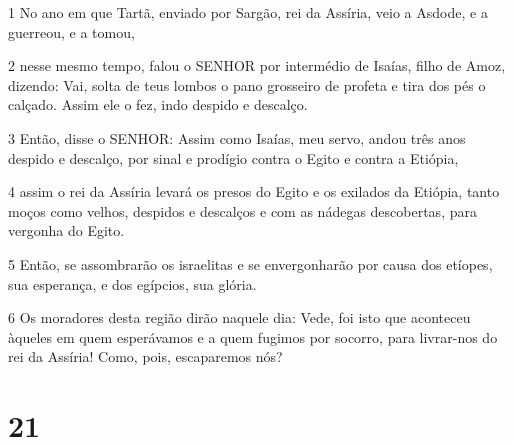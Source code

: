 \par 1 No ano em que Tartã, enviado por Sargão, rei da Assíria, veio a Asdode, e a guerreou, e a tomou,
\par 2 nesse mesmo tempo, falou o SENHOR por intermédio de Isaías, filho de Amoz, dizendo: Vai, solta de teus lombos o pano grosseiro de profeta e tira dos pés o calçado. Assim ele o fez, indo despido e descalço.
\par 3 Então, disse o SENHOR: Assim como Isaías, meu servo, andou três anos despido e descalço, por sinal e prodígio contra o Egito e contra a Etiópia,
\par 4 assim o rei da Assíria levará os presos do Egito e os exilados da Etiópia, tanto moços como velhos, despidos e descalços e com as nádegas descobertas, para vergonha do Egito.
\par 5 Então, se assombrarão os israelitas e se envergonharão por causa dos etíopes, sua esperança, e dos egípcios, sua glória.
\par 6 Os moradores desta região dirão naquele dia: Vede, foi isto que aconteceu àqueles em quem esperávamos e a quem fugimos por socorro, para livrar-nos do rei da Assíria! Como, pois, escaparemos nós?

\chapter{21}

